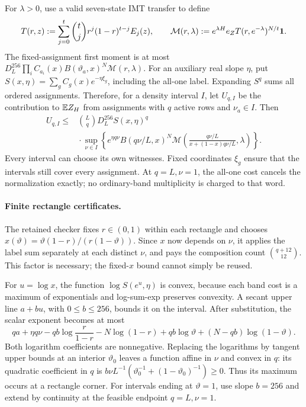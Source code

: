 For $\lambda>0$, use a valid seven-state IMT transfer to define
\[
 T(r,z):=\sum_{j=0}^t\binom tj r^j(1-r)^{t-j}E_j(z),\qquad
 \mathcal M(r,\lambda):=e^{\lambda H}e_ZT(r,e^{-\lambda})^{N/t}\mathbf 1.
\]
The fixed-assignment first moment is at most
$D_L^{256}\prod_iC_{a_i}(x)B(\vartheta_a,x)^N\mathcal M(r,\lambda)$.
For an auxiliary real slope $\eta$, put
$S(x,\eta)=\sum_g C_g(x)e^{-\eta\xi_g}$, including the all-one label.
Expanding $S^q$ sums all ordered assignments. Therefore, for a density
interval $I$, let $U_{q,I}$ be the contribution to $\mathbb E Z_H$ from
assignments with $q$ active rows and $\nu_a\in I$. Then
\begin{equation}
 \begin{split}
 U_{q,I}\le{}&\binom Lq D_L^{256} S(x,\eta)^q\\
 &{}\cdot\sup_{\nu\in I}
 \left\{e^{\eta q\nu}B(q\nu/L,x)^N
 \mathcal M\!\left(\frac{q\nu/L}{x+(1-x)q\nu/L},\lambda\right)\right\}.
 \end{split}
 \label{eq:finite-dense-tilt}
\end{equation}
Every interval can choose its own witnesses. Fixed coordinates $\xi_g$
ensure that the intervals still cover every assignment.
At $q=L,\nu=1$, the all-one cost cancels the normalization exactly;
no ordinary-band multiplicity is charged to that word.

\paragraph{Finite rectangle certificates.}
The retained checker fixes $r\in(0,1)$ within each rectangle and chooses
$x(\vartheta)=\vartheta(1-r)/(r(1-\vartheta))$.
Since $x$ now depends on $\nu$, it applies the label sum separately at each
distinct $\nu$, and pays the composition count $\binom{q+12}{12}$.
This factor is necessary; the fixed-$x$ bound cannot simply be reused.

For $u=\log x$, the function $\log S(e^u,\eta)$ is convex, because each band
cost is a maximum of exponentials and log-sum-exp preserves convexity.
A secant upper line $a+bu$, with $0\le b\le256$, bounds it on the interval.
After substitution, the scalar exponent becomes at most
\[
 qa+\eta q\nu-qb\log\frac r{1-r}-N\log(1-r)
       +qb\log\vartheta+(N-qb)\log(1-\vartheta).
\]
Both logarithm coefficients are nonnegative.
Replacing the logarithms by tangent upper bounds at an interior
$\vartheta_0$ leaves a function affine in $\nu$ and convex in $q$:
its quadratic coefficient in $q$ is
$b\nu L^{-1}(\vartheta_0^{-1}+(1-\vartheta_0)^{-1})\ge0$.
Thus its maximum occurs at a rectangle corner.
For intervals ending at $\vartheta=1$, use slope $b=256$ and extend by
continuity at the feasible endpoint $q=L,\nu=1$.

